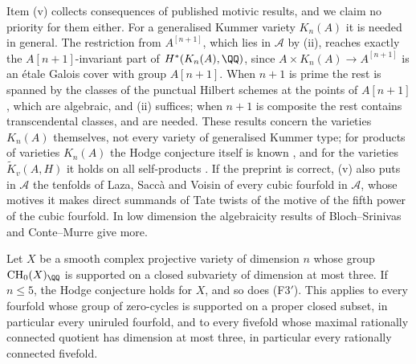 Item (v) collects consequences of published motivic results, and we claim no
priority for them either. For a generalised Kummer variety $K_{n}(A)$ it is
needed in general. The restriction from $A^{[n+1]}$, which lies in
$\mathcal{A}$ by (ii), reaches exactly the $A[n+1]$-invariant part of
$H^{*}(K_{n}(A),\QQ)$, since $A\times K_{n}(A)\to A^{[n+1]}$ is an \'etale
Galois cover with group $A[n+1]$. When $n+1$ is prime the rest is spanned by
the classes of the punctual Hilbert schemes at the points of $A[n+1]$, which
are algebraic, and (ii) suffices; when $n+1$ is composite the rest contains
transcendental classes, and \cite{Xu15,FTV19} are needed. These results
concern the varieties $K_{n}(A)$ themselves, not every variety of
generalised Kummer type; for products of varieties $K_{n}(A)$ the Hodge
conjecture itself is known \cite[Theorem~3.3]{Xu15}, and for the varieties
$\widetilde K_{v}(A,H)$ it holds on all self-products
\cite[Corollary~1.2]{Flo23}. If the
preprint \cite{Ped26} is correct, (v) also puts in $\mathcal{A}$ the tenfolds
of Laza, Sacc\`a and Voisin of every cubic fourfold in $\mathcal{A}$, whose
motives it makes direct summands of Tate twists of the motive of the fifth
power of the cubic fourfold. In low dimension the algebraicity results of
Bloch--Srinivas and Conte--Murre give more.

\begin{proposition}
\label{prop:f3primesmall}
Let $X$ be a smooth complex projective variety of dimension $n$ whose group
$\mathrm{CH}_{0}(X)_{\QQ}$ is supported on a closed subvariety of dimension at
most three. If $n\le5$, the Hodge conjecture holds for $X$, and so does
\textup{(F3$'$)}. This applies to every fourfold whose group of zero-cycles
is supported on a proper closed subset, in particular every uniruled
fourfold, and to every fivefold whose maximal rationally connected quotient
has dimension at most three, in particular every rationally connected
fivefold.
\end{proposition}

